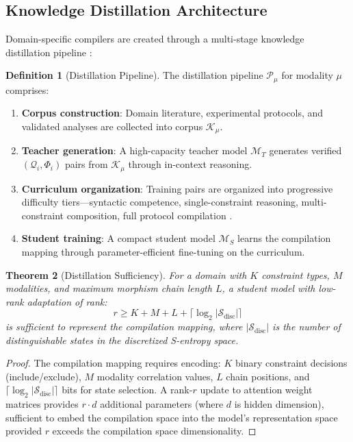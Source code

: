 \documentclass[10pt,twocolumn]{article}
\newtheorem{theorem}{Theorem}[section]
\theoremstyle{definition}
\newtheorem{definition}[theorem]{Definition}
\theoremstyle{remark}
\newcommand{\Sspace}{\mathcal{S}}
\newcommand{\morphism}{\Phi}
\newcommand{\question}{\mathcal{Q}}
\newcommand{\model}{\mathcal{M}}
\newcommand{\pipeline}{\mathcal{P}}
\begin{document}
\subsection{Knowledge Distillation Architecture}

Domain-specific compilers are created through a multi-stage knowledge distillation pipeline \cite{hinton2015}:

\begin{definition}[Distillation Pipeline]
\label{def:distillation}
The distillation pipeline $\pipeline_\mu$ for modality $\mu$ comprises:
\begin{enumerate}[nosep]
\item \textbf{Corpus construction}: Domain literature, experimental protocols, and validated analyses are collected into corpus $\mathcal{K}_\mu$.
\item \textbf{Teacher generation}: A high-capacity teacher model $\model_T$ generates verified $(\question_i, \morphism_i)$ pairs from $\mathcal{K}_\mu$ through in-context reasoning.
\item \textbf{Curriculum organization}: Training pairs are organized into progressive difficulty tiers---syntactic competence, single-constraint reasoning, multi-constraint composition, full protocol compilation \cite{bengio2009}.
\item \textbf{Student training}: A compact student model $\model_S$ learns the compilation mapping through parameter-efficient fine-tuning \cite{hu2022} on the curriculum.
\end{enumerate}
\end{definition}

\begin{theorem}[Distillation Sufficiency]
\label{thm:distillation}
For a domain with $K$ constraint types, $M$ modalities, and maximum morphism chain length $L$, a student model with low-rank adaptation of rank:
\begin{equation}
r \geq K + M + L + \lceil \log_2 |\Sspace_{\text{disc}}| \rceil
\end{equation}
is sufficient to represent the compilation mapping, where $|\Sspace_{\text{disc}}|$ is the number of distinguishable states in the discretized S-entropy space.
\end{theorem}

\begin{proof}
The compilation mapping requires encoding: $K$ binary constraint decisions (include/exclude), $M$ modality correlation values, $L$ chain positions, and $\lceil \log_2 |\Sspace_{\text{disc}}| \rceil$ bits for state selection. A rank-$r$ update to attention weight matrices provides $r \cdot d$ additional parameters (where $d$ is hidden dimension), sufficient to embed the compilation space into the model's representation space provided $r$ exceeds the compilation space dimensionality.
\end{proof}
\end{document}

